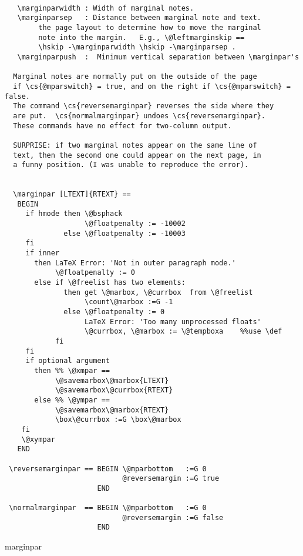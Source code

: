 \begin{verbatim}

   \marginparwidth : Width of marginal notes.
   \marginparsep   : Distance between marginal note and text.
        the page layout to determine how to move the marginal
        note into the margin.   E.g., \@leftmarginskip ==
        \hskip -\marginparwidth \hskip -\marginparsep .
   \marginparpush  :  Minimum vertical separation between \marginpar's

  Marginal notes are normally put on the outside of the page
  if \cs{@mparswitch} = true, and on the right if \cs{@mparswitch} = false.
  The command \cs{reversemarginpar} reverses the side where they
  are put.  \cs{normalmarginpar} undoes \cs{reversemarginpar}.
  These commands have no effect for two-column output.

  SURPRISE: if two marginal notes appear on the same line of
  text, then the second one could appear on the next page, in
  a funny position. (I was unable to reproduce the error).


  \marginpar [LTEXT]{RTEXT} ==
   BEGIN
     if hmode then \@bsphack
                   \@floatpenalty := -10002
              else \@floatpenalty := -10003
     fi
     if inner
       then LaTeX Error: 'Not in outer paragraph mode.'
            \@floatpenalty := 0
       else if \@freelist has two elements:
              then get \@marbox, \@currbox  from \@freelist
                   \count\@marbox :=G -1
              else \@floatpenalty := 0
                   LaTeX Error: 'Too many unprocessed floats'
                   \@currbox, \@marbox := \@tempboxa    %%use \def
            fi
     fi
     if optional argument
       then %% \@xmpar ==
            \@savemarbox\@marbox{LTEXT}
            \@savemarbox\@currbox{RTEXT}
       else %% \@ympar ==
            \@savemarbox\@marbox{RTEXT}
            \box\@currbox :=G \box\@marbox
    fi
    \@xympar 
   END

 \reversemarginpar == BEGIN \@mparbottom   :=G 0
                            @reversemargin :=G true
                      END

 \normalmarginpar  == BEGIN \@mparbottom   :=G 0
                            @reversemargin :=G false
                      END

\end{verbatim}




 \begin{docCommand}{marginpar}{}
    \begin{teX}
\def\marginpar{%
  \ifhmode
    \@bsphack
    \@floatpenalty -\@Mii
  \else
    \@floatpenalty-\@Miii
  \fi
  \ifinner
    \@parmoderr
    \@floatpenalty\z@
  \else
    \@next\@currbox\@freelist{}{}%
    \@next\@marbox\@freelist{\global\count\@marbox\m@ne}%
       {\@floatpenalty\z@
        \@fltovf\def\@currbox{\@tempboxa}\def\@marbox{\@tempboxa}}%
  \fi
  \@ifnextchar [\@xmpar\@ympar}
    \end{teX}
 \end{docCommand}


